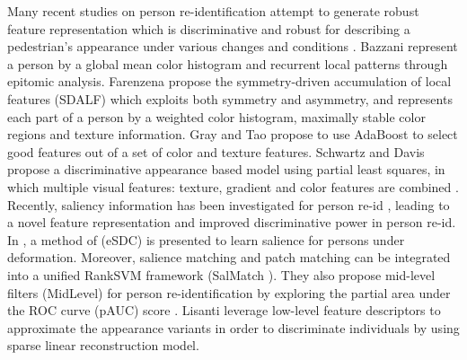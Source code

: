 \documentclass[10pt,journal,twocolumn]{IEEEtran}
\begin{document}
Many recent studies on person re-identification attempt to generate robust feature representation which is discriminative and robust for describing a pedestrian's appearance under various changes and conditions
 \cite{Bazzani2012Multiple,Farenzena2010Person,Gheissari2006Person,Gray2008Viewpoint,Wang2007Shape,Zhao2013Unsupervised,MidLevelFilter}.
Bazzani \etal\cite{Bazzani2012Multiple} represent a person by a global mean color histogram and recurrent local patterns through epitomic analysis.
Farenzena \etal\cite{Farenzena2010Person} propose the symmetry-driven accumulation of local features (SDALF) which exploits both symmetry and asymmetry, and represents each part of a person by a weighted color histogram, maximally stable color regions and texture information. Gray and Tao \cite{Gray2008Viewpoint} propose to use AdaBoost to select good features out of a set of color and texture features. Schwartz and Davis propose a discriminative appearance based model using partial least squares, in which multiple visual features: texture, gradient and color features are combined \cite{Schwartz2009Learning}. 
Recently, saliency information has been investigated for person re-id \cite{Zhao2013Unsupervised,Zhao2013SalMatch}, leading to a novel feature representation and improved discriminative power in person re-id.
In \cite{Zhao2013Unsupervised}, a method of (eSDC) is presented to learn salience for persons under deformation.
Moreover, salience matching and patch matching can be integrated into a unified RankSVM framework (SalMatch \cite{Zhao2013SalMatch}).
They also propose mid-level filters (MidLevel) for person re-identification
by exploring the partial area under the ROC curve (pAUC) score \cite{MidLevelFilter}. Lisanti \etal\cite{Giuseppe2015PAMI} leverage  low-level feature descriptors to approximate the appearance variants in order to discriminate individuals by using sparse linear reconstruction model.
\end{document}
